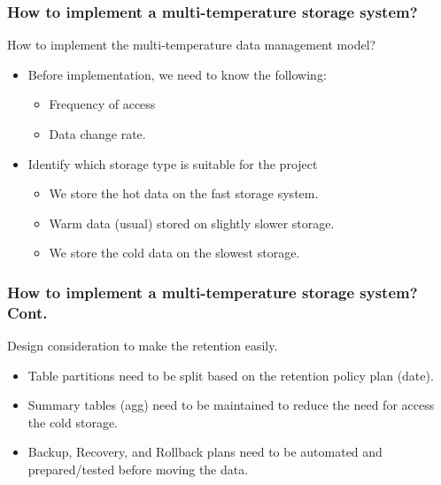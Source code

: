 \begin{frame}
\frametitle{How to implement a multi-temperature storage system? }

\begin{wideitemize}
\item How to implement the multi-temperature data management model?
\begin{itemize}[<+->]
\item Before implementation, we need to know the following:
\begin{itemize}[<+->]
\item Frequency of access
\item Data change rate.
\end{itemize}
\item Identify which storage type is suitable for the project
\begin{itemize}[<+->]
\item We store the hot data on the fast storage system.
\item Warm data (usual) stored on slightly slower storage.
\item We store the cold data on the slowest storage.
\end{itemize}
\end{itemize}
\end{wideitemize}
\end{frame}


\begin{frame}
\frametitle{How to implement a multi-temperature storage system? Cont.}

\begin{wideitemize}
\item Design consideration to make the retention easily.
\begin{itemize}[<+->]
\item Table partitions need to be split based on the retention policy plan \forexample (date).
\item Summary tables (agg) need to be maintained to reduce the need for access the cold storage.
\item Backup, Recovery, and Rollback plans need to be automated and prepared/tested before moving the data.
\end{itemize}
\end{wideitemize}
\end{frame}


